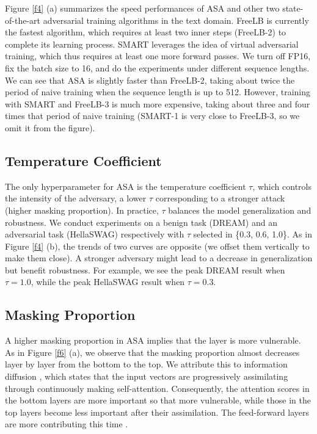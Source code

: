 \documentclass[letterpaper]{article} \usepackage{aaai23}  \usepackage{times}  \usepackage{helvet}  \usepackage{courier}  \usepackage[hyphens]{url}  \usepackage{graphicx} \urlstyle{rm} \def\UrlFont{\rm}  \usepackage{natbib}  \usepackage{caption} \frenchspacing  \setlength{\pdfpagewidth}{8.5in}  \setlength{\pdfpageheight}{11in}  \usepackage{algorithm}
\begin{document}
Figure \ref{f4} (a) summarizes the speed performances of ASA and other two state-of-the-art adversarial training algorithms in the text domain. FreeLB \citep{DBLP:conf/iclr/ZhuCGSGL20} is currently the fastest algorithm, which requires at least two inner steps (FreeLB-2) to complete its learning process. SMART \citep{DBLP:conf/acl/JiangHCLGZ20} leverages the idea of virtual adversarial training, which thus requires at least one more forward passes. We turn off FP16, fix the batch size to 16, and do the experiments under different sequence lengths. We can see that ASA is slightly faster than FreeLB-2, taking about twice the period of naive training when the sequence length is up to 512. However, training with SMART and FreeLB-3 is much more expensive, taking about three and four times that period of naive training (SMART-1 is very close to FreeLB-3, so we omit it from the figure).

\subsection{Temperature Coefficient}

The only hyperparameter for ASA is the temperature coefficient $ \tau $, which controls the intensity of the adversary, a lower $ \tau $ corresponding to a stronger attack (higher masking proportion). In practice, $ \tau $ balances the model generalization and robustness. We conduct experiments on a benign task (DREAM) and an adversarial task (HellaSWAG) respectively with $ \tau $ selected in \{0.3, 0.6, 1.0\}. As in Figure \ref{f4} (b), the trends of two curves are opposite (we offset them vertically to make them close). A stronger adversary might lead to a decrease in generalization but benefit robustness. For example, we see the peak DREAM result when $ \tau=1.0 $, while the peak HellaSWAG result when $ \tau=0.3 $.


\subsection{Masking Proportion}

A higher masking proportion in ASA implies that the layer is more vulnerable. As in Figure \ref{f6} (a), we observe that the masking proportion almost decreases layer by layer from the bottom to the top. We attribute this to information diffusion \citep{DBLP:conf/icml/GoyalCRCSV20}, which states that the input vectors are progressively assimilating through continuously making self-attention. Consequently, the attention scores in the bottom layers are more important so that more vulnerable, while those in the top layers become less important after their assimilation. The feed-forward layers are more contributing this time \citep{DBLP:conf/acl/YouSI20}.
\end{document}
